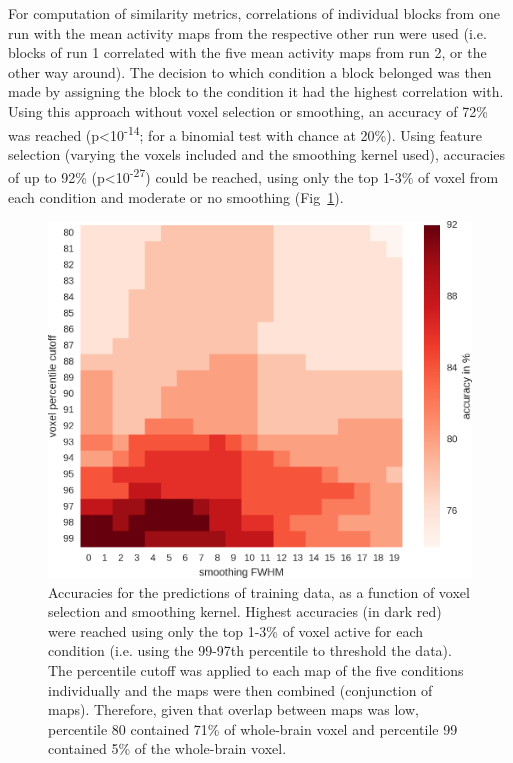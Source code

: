 \documentclass[fleqn,10pt]{SelfArx} %
\begin{document}
For computation of similarity metrics, correlations of individual blocks from one run with the mean activity maps from the respective other run were used (i.e. blocks of run 1 correlated with the five mean activity maps from run 2, or the other way around). The decision to which condition a block belonged was then made by assigning the block to the condition it had the highest correlation with. Using this approach without voxel selection or smoothing, an accuracy of 72\% was reached (p<10\textsuperscript{-14}; for a binomial test with chance at 20\%). Using feature selection (varying the voxels included and the smoothing kernel used), accuracies of up to 92\% (p<10\textsuperscript{-27}) could be reached, using only the top 1-3\% of voxel from each condition and moderate or no smoothing (Fig~\ref{fig:feature}).

\begin{figure}[htbp]
	
	\renewcommand{\familydefault}{\sfdefault}\normalfont
	\centering
	\includegraphics[width=\columnwidth]{./figs/fig3_featureSelection.png}
			\vspace*{-3mm}
	\caption{Accuracies for the predictions of training data, as a function of voxel selection and smoothing kernel. Highest accuracies (in dark red) were reached using only the top 1-3\% of voxel active for each condition (i.e. using the 99-97th percentile to threshold the data). The percentile cutoff was applied to each map of the five conditions individually and the maps were then combined (conjunction of maps). Therefore, given that overlap between maps was low, percentile 80 contained 71\% of whole-brain voxel and percentile 99 contained 5\% of the whole-brain voxel.}%
	\label{fig:feature}
	
\end{figure}
\end{document}
